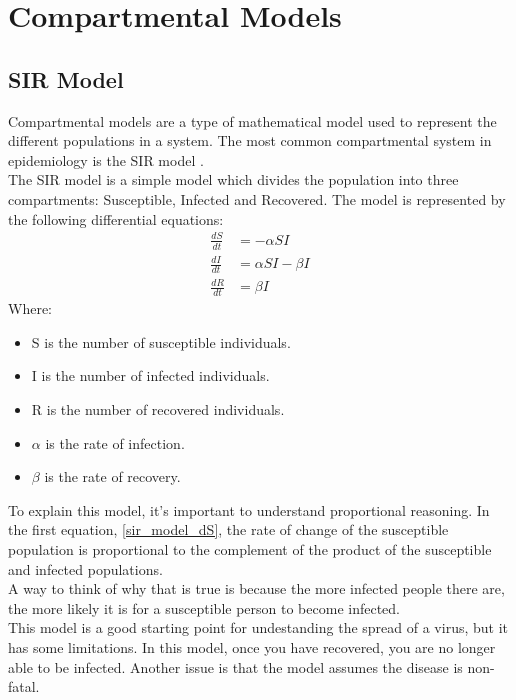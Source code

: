 \documentclass{report}
\begin{document}
\section{Compartmental Models}
\subsection{SIR Model}
Compartmental models are a type of mathematical model used to represent the different populations in a system. The most common compartmental system in epidemiology is the SIR model \cite{beckley2013modeling}.\\
The SIR model is a simple model which divides the population into three compartments: Susceptible, Infected and Recovered. The model is represented by the following differential equations:
\begin{align}
\frac{dS}{dt} &= -\alpha SI \label{sir_model_dS} \\
\frac{dI}{dt} &= \alpha SI - \beta I \label{sir_model_dI} \\
\frac{dR}{dt} &= \beta I \label{sir_model_dR}
\end{align}
Where:
\begin{itemize}
    \item S is the number of susceptible individuals.
    \item I is the number of infected individuals.
    \item R is the number of recovered individuals.
    \item $\alpha$ is the rate of infection.
    \item $\beta$ is the rate of recovery.
\end{itemize}
To explain this model, it's important to understand proportional reasoning. In the first equation, \ref{sir_model_dS}, the rate of change of the susceptible population is proportional to the complement of the product of the susceptible and infected populations.\\
A way to think of why that is true is because the more infected people there are, the more likely it is for a susceptible person to become infected.\\
This model is a good starting point for undestanding the spread of a virus, but it has some limitations. In this model, once you have recovered, you are no longer able to be infected. Another issue is that the model assumes the disease is non-fatal.
\end{document}
